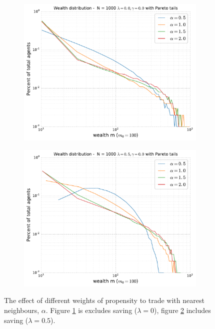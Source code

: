 \documentclass[10pt, a4paper]{amsart}
\begin{document}
\begin{figure}
\begin{subfigure}{.49\textwidth}
	\centering
	\includegraphics[width=\linewidth]{../figures/5d/5d_0-var-0.pdf}
	\caption{}
	\label{fig:neighbour1}
\end{subfigure}
\begin{subfigure}{.49\textwidth}
	\centering
	\includegraphics[width=\linewidth]{../figures/5d/5d_05-var-0.pdf}
	\caption{}
	\label{fig:neighbour2}
\end{subfigure}
\caption{The effect of different weights of propensity to trade with nearest neighbours, $\alpha$. Figure \ref{fig:neighbour1} is excludes saving ($\lambda = 0$), figure \ref{fig:neighbour2} includes saving ($\lambda = 0.5$).}
\label{fig:neighbour}
\end{figure}
\end{document}
